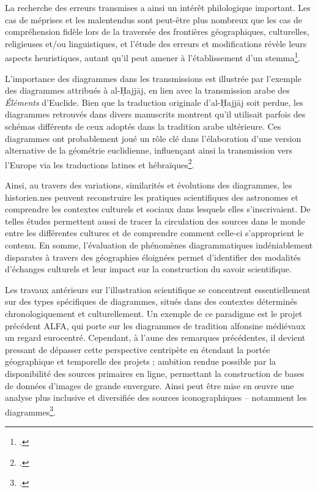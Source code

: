La recherche des erreurs
transmises a ainsi un intérêt philologique important. Les cas de
méprises et les malentendus sont peut-être plus nombreux que les cas de
compréhension fidèle lors de la traversée des frontières géographiques,
culturelles, religieuses et/ou linguistiques, et l'étude des erreurs et modifications
révèle leurs aspects heuristiques, autant qu'il peut amener à
l'établissement d'un stemma\footcite{raynaud_building_2014}.

L'importance des diagrammes dans les transmissions est illustrée par l'exemple des diagrammes attribués à al-Ḥajjāj, en lien avec la transmission arabe des \emph{Éléments} d'Euclide. Bien que la traduction originale d'al-Ḥajjāj soit perdue, les diagrammes retrouvés dans divers manuscrits montrent qu'il utilisait parfois des schémas différents de ceux adoptés dans la tradition arabe ultérieure. Ces diagrammes ont probablement joué un rôle clé dans l'élaboration d'une version alternative de la géométrie euclidienne, influençant ainsi la transmission vers l'Europe via les traductions latines et hébraïques\footcite{de_young_editing_2014}.

Ainsi, au travers des variations, similarités et évolutions des
diagrammes, les historien.nes peuvent reconstruire les pratiques
scientifiques des astronomes et comprendre les contextes culturels et
sociaux dans lesquels elles s'inscrivaient. De telles études permettent
aussi de tracer la circulation des sources dans le monde entre les
différentes cultures et de comprendre comment celle-ci s'approprient le
contenu. En somme, l'évaluation de phénomènes diagrammatiques
indéniablement disparates à travers des géographies éloignées permet
d'identifier des modalités d'échanges culturels et leur impact sur la
construction du savoir scientifique.

Les travaux antérieurs sur l'illustration scientifique se concentrent
essentiellement sur des types spécifiques de diagrammes, situés dans des
contextes déterminés chronologiquement et culturellement. Un exemple de
ce paradigme est le projet précédent ALFA, qui porte sur les diagrammes
de tradition alfonsine médiévaux un regard eurocentré. Cependant, à
l'aune des remarques précédentes, il devient pressant de dépasser cette
perspective centripète en étendant la portée géographique et temporelle
des projets ; ambition rendue possible par la disponibilité des sources
primaires en ligne, permettant la construction de bases de données
d'images de grande envergure. Ainsi peut être mise en œuvre une analyse
plus inclusive et diversifiée des sources iconographiques -- notamment
les diagrammes\footcite{husson_eida_2022}.

